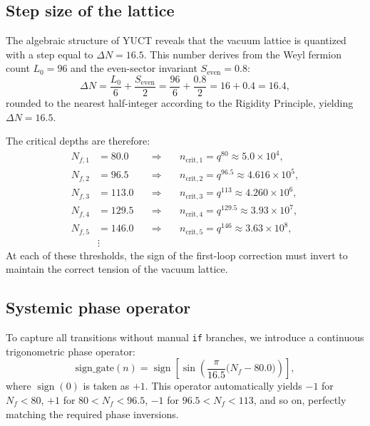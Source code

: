 \documentclass[12pt,a4paper]{article}
\newcommand{\Seven}{S_{\mathrm{even}}}
\begin{document}
	\subsection{Step size of the lattice}
	The algebraic structure of YUCT reveals that the vacuum lattice is quantized with a step equal to \(\Delta N = 16.5\). This number derives from the Weyl fermion count \(L_0 = 96\) and the even-sector invariant \(\Seven = 0.8\):
	\[
	\Delta N = \frac{L_0}{6} + \frac{\Seven}{2} = \frac{96}{6} + \frac{0.8}{2} = 16 + 0.4 = 16.4,
	\]
	rounded to the nearest half-integer according to the Rigidity Principle, yielding \(\Delta N = 16.5\).
	
	The critical depths are therefore:
	\begin{align}
		N_{f,1} &= 80.0 \quad &\Longrightarrow&\quad n_{\mathrm{crit},1} = q^{80} \approx 5.0\times10^4, \\
		N_{f,2} &= 96.5 \quad &\Longrightarrow&\quad n_{\mathrm{crit},2} = q^{96.5} \approx 4.616\times10^5, \\
		N_{f,3} &= 113.0 \quad &\Longrightarrow&\quad n_{\mathrm{crit},3} = q^{113} \approx 4.260\times10^6, \\
		N_{f,4} &= 129.5 \quad &\Longrightarrow&\quad n_{\mathrm{crit},4} = q^{129.5} \approx 3.93\times10^7, \\
		N_{f,5} &= 146.0 \quad &\Longrightarrow&\quad n_{\mathrm{crit},5} = q^{146} \approx 3.63\times10^8, \\
		&\vdots & &
	\end{align}
	At each of these thresholds, the sign of the first-loop correction must invert to maintain the correct tension of the vacuum lattice.
	
	\subsection{Systemic phase operator}
	To capture all transitions without manual \texttt{if} branches, we introduce a continuous trigonometric phase operator:
	\begin{equation}
		\boxed{\mathrm{sign\_gate}(n) = \operatorname{sign}\!\left[\sin\!\left(\frac{\pi}{16.5}\bigl(N_f - 80.0\bigr)\right)\right]},
		\label{eq:phaseoperator}
	\end{equation}
	where \(\operatorname{sign}(0)\) is taken as \(+1\). This operator automatically yields \(-1\) for \(N_f<80\), \(+1\) for \(80 < N_f < 96.5\), \(-1\) for \(96.5 < N_f < 113\), and so on, perfectly matching the required phase inversions.
	
\end{document}
